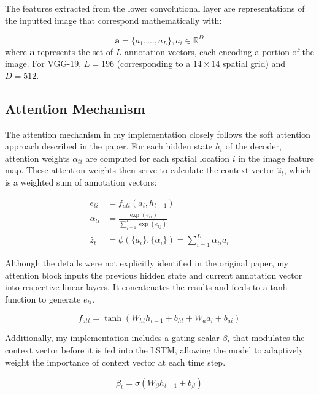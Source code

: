 \documentclass{article}
\theoremstyle{plain}
\theoremstyle{definition}
\theoremstyle{remark}
\begin{document}
The features extracted from the lower convolutional layer are representations of the inputted image that correspond mathematically with:

\begin{equation}
\textbf{a} = \{a_1, \ldots, a_L\}, a_i \in \mathbb{R}^D
\end{equation}
where $\textbf{a}$ represents the set of $L$ annotation vectors, each encoding a portion of the image. For VGG-19, $L = 196$ (corresponding to a $14 \times 14$ spatial grid) and $D = 512$.

\subsection{Attention Mechanism}

The attention mechanism in my implementation closely follows the soft attention approach described in the paper. For each hidden state $h_t$ of the decoder, attention weights $\alpha_{ti}$ are computed for each spatial location $i$ in the image feature map. These attention weights then serve to calculate the context vector $\hat{z}_t$, which is a weighted sum of annotation vectors:

\begin{align}
e_{ti} &= f_{att}(a_i, h_{t-1}) \\
\alpha_{ti} &= \frac{\exp(e_{ti})}{\sum_{j=1}^{L} \exp(e_{tj})} \\
\hat{z}_t &= \phi(\{a_i\}, \{\alpha_i\}) = \sum_{i=1}^{L} \alpha_{ti} a_i
\end{align}

Although the details were not explicitly identified in the original paper, my attention block inputs the previous hidden state and current annotation vector into respective linear layers. It concatenates the results and feeds to a  tanh function to generate $e_{ti}$. 

\begin{equation}
f_{att} = \tanh(W_{ht} h_{t-1} + b_{ht} + W_{a} a_i + b_{ai})
\end{equation}

Additionally, my implementation includes a gating scalar $\beta_t$ that modulates the context vector before it is fed into the LSTM, allowing the model to adaptively weight the importance of context vector at each time step.

\begin{equation}
\beta_t = \sigma(W_{\beta} h_{t-1} + b_{\beta})
\end{equation}
\end{document}
